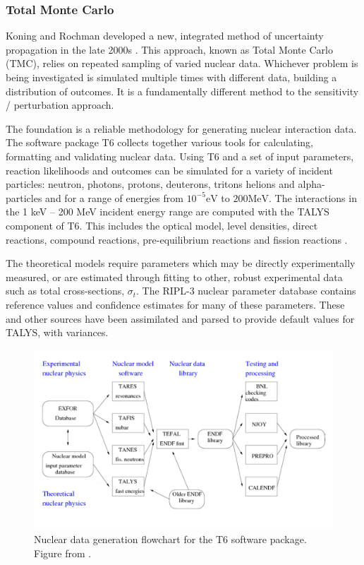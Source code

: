 \FloatBarrier
\subsubsection{Total Monte Carlo}
\label{subsubsec:tmc}
Koning and Rochman developed a new, integrated method of uncertainty propagation in the late 2000s \cite{Koning2008}. This approach, known as Total Monte Carlo (TMC), relies on repeated sampling of varied nuclear data. Whichever problem is being investigated is simulated multiple times with different data, building a distribution of outcomes. It is a fundamentally different method to the sensitivity / perturbation approach. 

The foundation is a reliable methodology for generating nuclear interaction data. The software package T6 \cite{Koning2005} collects together various tools for calculating, formatting and validating nuclear data. Using T6 and a set of input parameters, reaction likelihoods and outcomes can be simulated for a variety of incident particles: neutron, photons, protons, deuterons, tritons helions and alpha-particles and for a range of energies from $10^{-5}\mathrm{eV}$ to $200\mathrm{MeV}$. The interactions in the 1 keV -- 200 MeV incident energy range are computed with the TALYS component of T6. This includes the optical model, level densities, direct reactions, compound reactions, pre-equilibrium reactions and fission reactions \cite{TALYS2017}.

The theoretical models require parameters which may be directly experimentally measured, or are estimated through fitting to other, robust experimental data such as total cross-sections, $\sigma_{t}$. The RIPL-3 nuclear parameter database \cite{Capote2009} contains reference values and confidence estimates for many of these parameters. These and other sources have been assimilated and parsed to provide default values for TALYS, with variances. 

\begin{figure}
  \centering
  \includegraphics[width=\textwidth]{t6_flow.png}
  \caption[Nuclear data generation in T6 package.]{Nuclear data generation flowchart for the T6 software package. Figure from \cite{Koning2013}.}
  \label{fig:t6_overview}
\end{figure}

